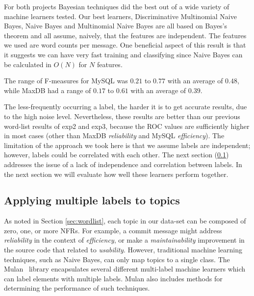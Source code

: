 \documentclass[]{sig-alternate}
\begin{document}
For both projects Bayesian techniques did the best out of a wide variety of machine learners tested. 
Our best learners, Discriminative Multinomial Naive Bayes, Naive Bayes  and Multinomial Naive Bayes  are all based on Bayes's theorem and all assume, naively, that the features are independent. 
The features we used are word counts per message. 
One beneficial aspect of this result is that it suggests we can have very fast training and classifying  since Naive Bayes can be calculated in $O(N)$ for $N$ features.


The range of F-measures for MySQL was $0.21$ to $0.77$ with an average
of $0.48$, while MaxDB had a range of $0.17$ to $0.61$ with an average
of $0.39$.


The less-frequently occurring a label, the harder it is to get accurate
results, due to the high noise level. Nevertheless, these results are
better than our previous word-list results of \textsf{exp2} and
\textsf{exp3}, because the ROC values are sufficiently higher in most
cases (other than MaxDB \emph{reliability} and MySQL \emph{efficiency}). The
limitation of the approach we took here is that we assume labels are
independent; however, labels could be correlated with each other. 
The next section (\ref{sec:multilabel})
addresses the issue of a lack of independence and correlation between labels.
In the next section we will evaluate how well these learners perform
together.

\subsection{Applying multiple labels to topics}
\label{sec:multilabel}

As noted in Section \ref{sec:wordlist}, each topic in our data-set can be composed of zero, one, or more NFRs. 
For example, a commit message might address \textit{reliability} in the context of \textit{efficiency}, or make a \textit{maintainability} improvement in the source code that related to \textit{usability}. 
However, traditional machine learning techniques, such as Naive Bayes, can only map topics to a single class. 
The Mulan~\cite{mulan} library encapsulates several different multi-label machine learners which can label elements with multiple labels.
Mulan also includes methods for determining the performance of such techniques.
\end{document}
